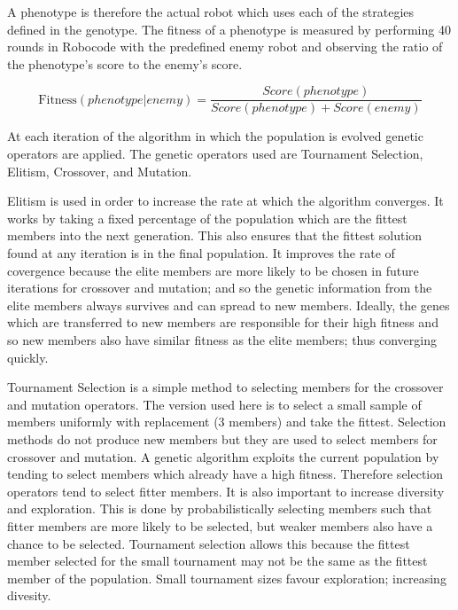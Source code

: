 A phenotype is therefore the actual robot which uses each of the strategies defined in the genotype. The fitness of a phenotype is measured by performing 40 rounds in Robocode with the predefined enemy robot and observing the ratio of the phenotype's score to the enemy's score.

\begin{equation}
\text{Fitness}\left({phenotype}|{enemy}\right) = \frac{Score(phenotype)}{Score(phenotype) + Score(enemy)}
\end{equation}

At each iteration of the algorithm in which the population is evolved genetic operators are applied. The genetic operators used are Tournament Selection, Elitism, Crossover, and Mutation. 

Elitism is used in order to increase the rate at which the algorithm converges. It works by taking a fixed percentage of the population which are the fittest members into the next generation. This also ensures that the fittest solution found at any iteration is in the final population. It improves the rate of covergence because the elite members are more likely to be chosen in future iterations for crossover and mutation; and so the genetic information from the elite members always survives and can spread to new members. Ideally, the genes which are transferred to new members are responsible for their high fitness and so new members also have similar fitness as the elite members; thus converging quickly.

Tournament Selection is a simple method to selecting members for the crossover and mutation operators. The version used here is to select a small sample of members uniformly with replacement (3 members) and take the fittest. Selection methods do not produce new members but they are used to select members for crossover and mutation. A genetic algorithm exploits the current population by tending to select members which already have a high fitness. Therefore selection operators tend to select fitter members. It is also important to increase diversity and exploration. This is done by probabilistically selecting members such that fitter members are more likely to be selected, but weaker members also have a chance to be selected. Tournament selection allows this because the fittest member selected for the small tournament may not be the same as the fittest member of the population. Small tournament sizes favour exploration; increasing divesity.


